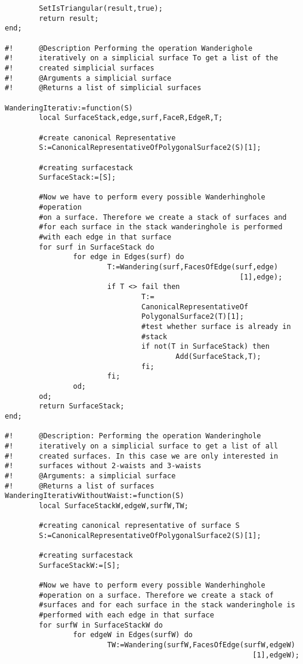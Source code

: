 \documentclass[12pt,titlepage,twoside,cleardoublepage]{article}
\theoremstyle{nummermitklammern}
\numberwithin{equation}{section}
\begin{document}
\begin{linenumbers}
\begin{verbatim}
        SetIsTriangular(result,true);
        return result;
end;

#!      @Description Performing the operation Wanderighole 
#!      iteratively on a simplicial surface To get a list of the 
#!      created simplicial surfaces
#!      @Arguments a simplicial surface
#!      @Returns a list of simplicial surfaces

WanderingIterativ:=function(S)
        local SurfaceStack,edge,surf,FaceR,EdgeR,T;

        #create canonical Representative
        S:=CanonicalRepresentativeOfPolygonalSurface2(S)[1];

        #creating surfacestack
        SurfaceStack:=[S];

        #Now we have to perform every possible Wanderhinghole 
        #operation
        #on a surface. Therefore we create a stack of surfaces and
        #for each surface in the stack wanderinghole is performed
        #with each edge in that surface
        for surf in SurfaceStack do
                for edge in Edges(surf) do
                        T:=Wandering(surf,FacesOfEdge(surf,edge)
                                                       [1],edge);
                        if T <> fail then
                                T:=
                                CanonicalRepresentativeOf
                                PolygonalSurface2(T)[1];
                                #test whether surface is already in 
                                #stack
                                if not(T in SurfaceStack) then
                                        Add(SurfaceStack,T);
                                fi;
                        fi;
                od;
        od;
        return SurfaceStack;
end;

#!      @Description: Performing the operation Wanderinghole 
#!      iteratively on a simplicial surface to get a list of all 
#!      created surfaces. In this case we are only interested in
#!      surfaces without 2-waists and 3-waists
#!      @Arguments: a simplicial surface
#!      @Returns a list of surfaces
WanderingIterativWithoutWaist:=function(S)
        local SurfaceStackW,edgeW,surfW,TW;

        #creating canonical representative of surface S
        S:=CanonicalRepresentativeOfPolygonalSurface2(S)[1];

        #creating surfacestack
        SurfaceStackW:=[S];

        #Now we have to perform every possible Wanderhinghole 
        #operation on a surface. Therefore we create a stack of 
        #surfaces and for each surface in the stack wanderinghole is 
        #performed with each edge in that surface
        for surfW in SurfaceStackW do
                for edgeW in Edges(surfW) do
                        TW:=Wandering(surfW,FacesOfEdge(surfW,edgeW)
                                                          [1],edgeW);


\end{verbatim}
\end{linenumbers}
\end{document}
